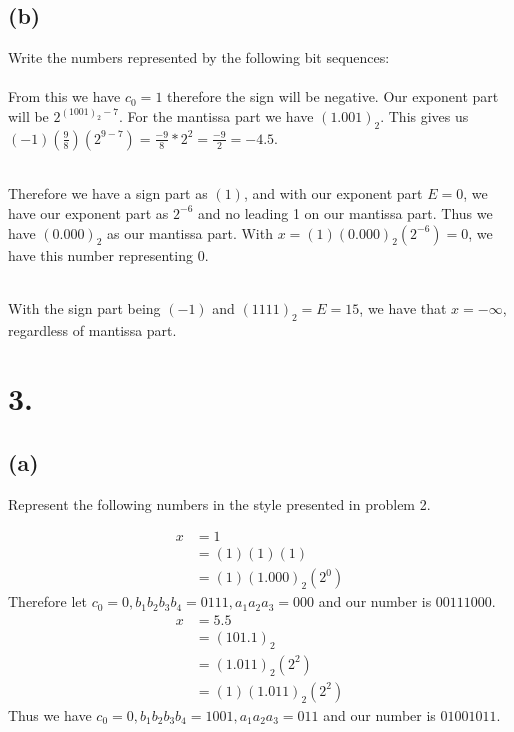 \documentclass{article}
\begin{document}
	\subsection*{(b)}
		Write the numbers represented by the following bit sequences: \\
			
		 \\
			From this we have $c_0 = 1$ therefore the sign will be negative. Our exponent part will be $2^{(1001)_2 - 7}$.
			For the mantissa part we have $(1.001)_2$. This gives us $(-1)(\frac{9}{8})(2^{9-7}) = \frac{-9}{8} * 2^2 = \frac{-9}{2} = -4.5$.

		 \\
			Therefore we have a sign part as $(1)$, and with our exponent part $E = 0$, we have our exponent part as $2^{-6}$ and no leading 1 on our mantissa part.
			Thus we have $(0.000)_2$ as our mantissa part.
			With $x = (1)(0.000)_2(2^{-6}) = 0$, we have this number representing 0.

		 \\
			With the sign part being $(-1)$ and $(1111)_2 = E = 15$, we have that $x = -\infty$, regardless of mantissa part.

\section*{3.}
	\subsection*{(a)}
		Represent the following numbers in the style presented in problem 2.

			\begin{align*}
				x & = 1 \\
				& = (1)(1)(1) \\
				& = (1)(1.000)_2(2^0)
			\end{align*}
			Therefore let $c_0 = 0, b_1b_2b_3b_4 = 0111, a_1a_2a_3 = 000$ and our number is $00111000$. \\

			\begin{align*}
				x & = 5.5 \\
				& = (101.1)_2 \\
				& = (1.011)_2(2^2) \\
				& = (1)(1.011)_2(2^2)
			\end{align*}
			Thus we have $c_0 = 0, b_1b_2b_3b_4 = 1001, a_1a_2a_3 = 011$ and our number is $01001011$. \\
\end{document}
